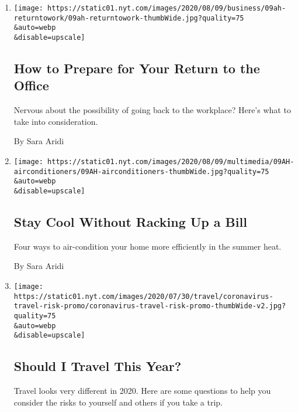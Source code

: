 \begin{enumerate}
\def\labelenumi{\arabic{enumi}.}
\item
  \href{/2020/08/08/at-home/office-return-coronavirus.html}{}

  \texttt{[image: https://static01.nyt.com/images/2020/08/09/business/09ah-returntowork/09ah-returntowork-thumbWide.jpg?quality=75\\\&auto=webp\\\&disable=upscale]}

  \hypertarget{how-to-prepare-for-your-return-to-the-office}{%
  \subsection{How to Prepare for Your Return to the
  Office}\label{how-to-prepare-for-your-return-to-the-office}}

  Nervous about the possibility of going back to the workplace? Here's
  what to take into consideration.

  By Sara Aridi
\item
  \href{/2020/08/08/at-home/lower-air-conditioning-bill.html}{}

  \texttt{[image: https://static01.nyt.com/images/2020/08/09/multimedia/09AH-airconditioners/09AH-airconditioners-thumbWide.jpg?quality=75\\\&auto=webp\\\&disable=upscale]}

  \hypertarget{stay-cool-without-racking-up-a-bill}{%
  \subsection{Stay Cool Without Racking Up a
  Bill}\label{stay-cool-without-racking-up-a-bill}}

  Four ways to air-condition your home more efficiently in the summer
  heat.

  By Sara Aridi
\item
  \href{/interactive/2020/07/31/travel/coronavirus-travel-risk.html}{}

  \texttt{[image: https://static01.nyt.com/images/2020/07/30/travel/coronavirus-travel-risk-promo/coronavirus-travel-risk-promo-thumbWide-v2.jpg?quality=75\\\&auto=webp\\\&disable=upscale]}

  \hypertarget{should-i-travel-this-year}{%
  \subsection{Should I Travel This
  Year?}\label{should-i-travel-this-year}}

  Travel looks very different in 2020. Here are some questions to help
  you consider the risks to yourself and others if you take a trip.


\end{enumerate}
